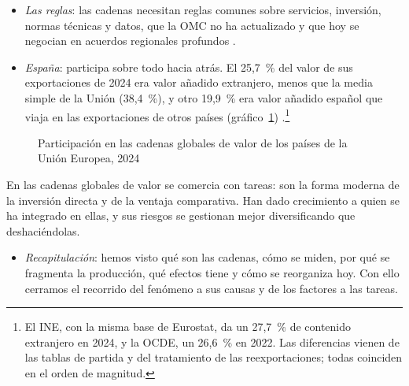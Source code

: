 \documentclass[11pt]{article}
\begin{document}
\begin{itemize}
\begin{itemize}
  \item La defensa está en diversificar proveedores y en conocer la cadena, no en cerrarla\nocite{BaldwinFreeman2022}.
  \end{itemize}
\item \emph{Las reglas}: las cadenas necesitan reglas comunes sobre servicios, inversión, normas técnicas y datos, que la OMC no ha actualizado y que hoy se negocian en acuerdos regionales profundos  .
\item \emph{España}: participa sobre todo hacia atrás. El 25,7~\% del valor de sus exportaciones de 2024 era valor añadido extranjero, menos que la media simple de la Unión (38,4~\%), y otro 19,9~\% era valor añadido español que viaja en las exportaciones de otros países (gráfico~\ref{fig:contenido-importado})\nocite{Eurostat2026FIGAROcgv} .\footnote{El INE, con la misma base de Eurostat, da un 27,7~\% de contenido extranjero en 2024\nocite{INE2026TiVA2024}, y la OCDE, un 26,6~\% en 2022\nocite{OCDE2025TiVA}. Las diferencias vienen de las tablas de partida y del tratamiento de las reexportaciones; todas coinciden en el orden de magnitud.}
\end{itemize}

\begin{figure}[H]
\centering
\caption{Participación en las cadenas globales de valor de los países de la Unión Europea, 2024}\label{fig:contenido-importado}
\end{figure}

\begin{ideaclave}
En las cadenas globales de valor se comercia con tareas: son la forma moderna de la inversión directa y de la ventaja comparativa. Han dado crecimiento a quien se ha integrado en ellas, y sus riesgos se gestionan mejor diversificando que deshaciéndolas.
\end{ideaclave}

\begin{itemize}
\item \emph{Recapitulación}: hemos visto qué son las cadenas, cómo se miden, por qué se fragmenta la producción, qué efectos tiene y cómo se reorganiza hoy. Con ello cerramos el recorrido del fenómeno a sus causas y de los factores a las tareas.
\end{itemize}
\end{document}
